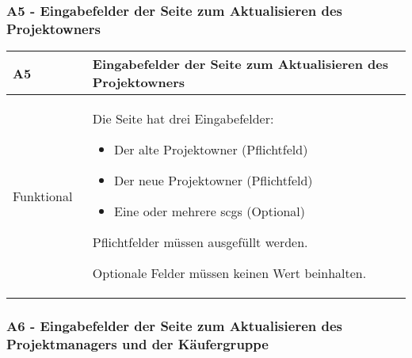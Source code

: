 \subsubsection[A5 - Eingabefelder der Seite zum Aktualisieren des Projektowners]{A5 - Eingabefelder der Seite zum Aktualisieren des Projektowners}

\begin{center}
    \begin{tabular}{ |p{0.2\linewidth}|p{0.8\linewidth}| } 
        \hline
        \rowcolor{lightgray}
        \textbf{A5} & \textbf{Eingabefelder der Seite zum Aktualisieren des Projektowners} \\
        \hline
        Funktional & Die Seite hat drei Eingabefelder:
        \begin{itemize}
            \item Der alte Projektowner (Pflichtfeld)
            \item Der neue Projektowner (Pflichtfeld)
            \item Eine oder mehrere \glspl{scg} (Optional)
        \end{itemize} 
        Pflichtfelder müssen ausgefüllt werden. 
        
        Optionale Felder müssen keinen Wert beinhalten.\\ 
        \hline
    \end{tabular}
\end{center}

\subsubsection[A6 - Eingabefelder der Seite zum Aktualisieren des Projektmanagers und der Käufergruppe]{A6 - Eingabefelder der Seite zum Aktualisieren des Projektmanagers und der Käufergruppe}

